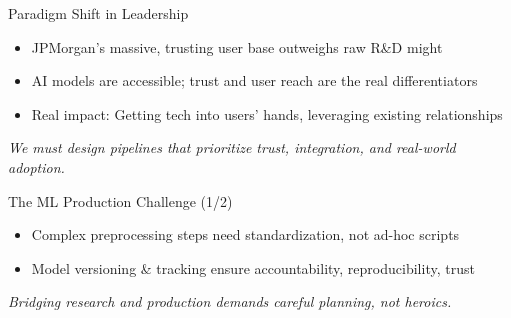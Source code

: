 \documentclass[aspectratio=169]{beamer}
\begin{document}
%
%
%
\begin{frame}{Paradigm Shift in Leadership}
\begin{itemize}
\item JPMorgan’s massive, trusting user base outweighs raw R\&D might
\item AI models are accessible; trust and user reach are the real differentiators
\item Real impact: Getting tech into users’ hands, leveraging existing relationships
\end{itemize}

\vspace{0.8em}
\emph{We must design pipelines that prioritize trust, integration, and real-world adoption.}
\end{frame}

%
%
%
\begin{frame}{The ML Production Challenge (1/2)}
\begin{itemize}
\item Complex preprocessing steps need standardization, not ad-hoc scripts
\item Model versioning \& tracking ensure accountability, reproducibility, trust
\end{itemize}

\vspace{0.8em}
\emph{Bridging research and production demands careful planning, not heroics.}
\end{frame}
\end{document}
